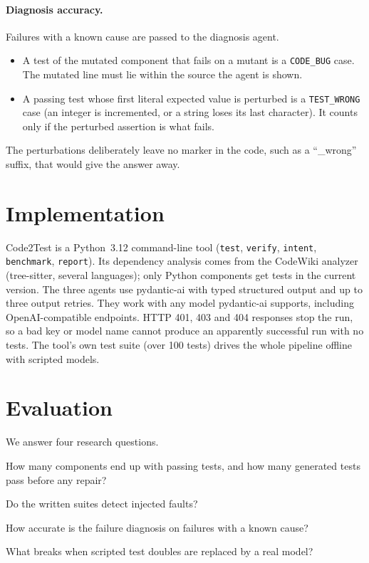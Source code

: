 \documentclass[11pt]{article}
\newcommand{\toolname}{Code2Test}
\newcommand{\code}[1]{\texttt{#1}}
\begin{document}
\paragraph{Diagnosis accuracy.}
Failures with a known cause are passed to the diagnosis agent.
\begin{itemize}
  \item A test of the mutated component that fails on a mutant is a \code{CODE\_BUG} case.
  The mutated line must lie within the source the agent is shown.
  \item A passing test whose first literal expected value is perturbed is a \code{TEST\_WRONG} case (an integer is incremented, or a string loses its last character).
  It counts only if the perturbed assertion is what fails.
\end{itemize}
The perturbations deliberately leave no marker in the code, such as a ``\_wrong'' suffix, that would give the answer away.

\section{Implementation}

\toolname{} is a Python~3.12 command-line tool (\code{test}, \code{verify}, \code{intent}, \code{benchmark}, \code{report}).
Its dependency analysis comes from the CodeWiki analyzer (tree-sitter, several languages); only Python components get tests in the current version.
The three agents use pydantic-ai with typed structured output and up to three output retries.
They work with any model pydantic-ai supports, including OpenAI-compatible endpoints.
HTTP 401, 403 and 404 responses stop the run, so a bad key or model name cannot produce an apparently successful run with no tests.
The tool's own test suite (over 100 tests) drives the whole pipeline offline with scripted models.

\section{Evaluation}\label{sec:evaluation}

We answer four research questions.
\begin{description}[leftmargin=1.2cm,style=nextline]
  \item[RQ1] How many components end up with passing tests, and how many generated tests pass before any repair?
  \item[RQ2] Do the written suites detect injected faults?
  \item[RQ3] How accurate is the failure diagnosis on failures with a known cause?
  \item[RQ4] What breaks when scripted test doubles are replaced by a real model?
\end{description}
\end{document}
